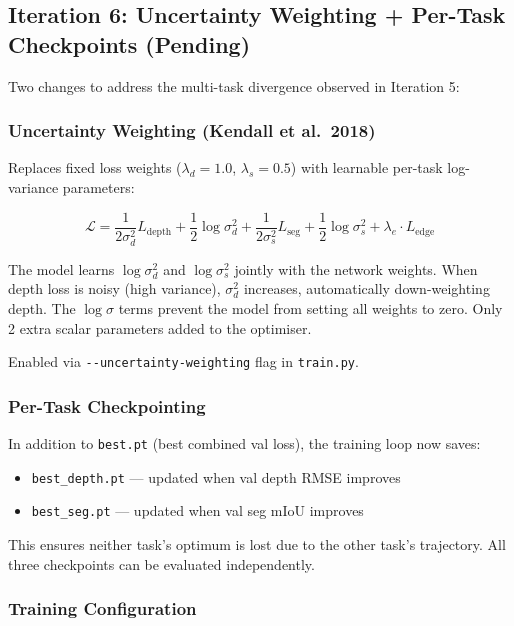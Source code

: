 \documentclass[11pt,a4paper]{article}
\begin{document}
\subsection{Iteration 6: Uncertainty Weighting + Per-Task Checkpoints (Pending)}

Two changes to address the multi-task divergence observed in Iteration 5:

\subsubsection{Uncertainty Weighting (Kendall et al.\ 2018)}

Replaces fixed loss weights ($\lambda_d = 1.0$, $\lambda_s = 0.5$) with
learnable per-task log-variance parameters:

\[
  \mathcal{L} = \frac{1}{2\sigma_d^2} L_{\text{depth}} + \frac{1}{2} \log \sigma_d^2
              + \frac{1}{2\sigma_s^2} L_{\text{seg}} + \frac{1}{2} \log \sigma_s^2
              + \lambda_e \cdot L_{\text{edge}}
\]

The model learns $\log \sigma_d^2$ and $\log \sigma_s^2$ jointly with the
network weights. When depth loss is noisy (high variance), $\sigma_d^2$
increases, automatically down-weighting depth. The $\log \sigma$ terms
prevent the model from setting all weights to zero. Only 2 extra scalar
parameters added to the optimiser.

Enabled via \texttt{-{}-uncertainty-weighting} flag in \texttt{train.py}.

\subsubsection{Per-Task Checkpointing}

In addition to \texttt{best.pt} (best combined val loss), the training
loop now saves:

\begin{itemize}[nosep]
  \item \texttt{best\_depth.pt} --- updated when val depth RMSE improves
  \item \texttt{best\_seg.pt} --- updated when val seg mIoU improves
\end{itemize}

This ensures neither task's optimum is lost due to the other task's
trajectory. All three checkpoints can be evaluated independently.

\subsubsection{Training Configuration}
\end{document}
